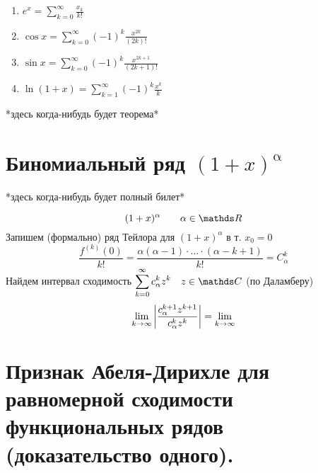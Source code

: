 \documentclass[matan]{subfiles}
\begin{document}
  \begin{examples}
  	\begin{enumerate}
  		\item $\displaystyle e^x = \sum_{k = 0}^\infty \frac{x_k}{k!}$
  		\item $\displaystyle \cos x = \sum_{k = 0}^\infty (-1)^k \frac{x^{2k} }{(2k)!}$
  		\item $\displaystyle \sin x = \sum_{k = 0}^\infty (-1)^k \frac{x^{2k + 1} }{(2k + 1)!}$
  		\item $\displaystyle \ln (1 + x) = \sum_{k = 1}^\infty (-1)^k \frac{x^k}{k}$
  	\end{enumerate}
  \end{examples}

  \begin{TTheorem}
    *здесь когда-нибудь будет теорема*
  \end{TTheorem}


  \newpage
  \section{Биномиальный ряд $(1 + x)^\upalpha$}

  *здесь когда-нибудь будет полный билет*

  \begin{Definition}
  	\[(1 + x)^\alpha \q\q \alpha \in \R\]
  	Запишем (формально) ряд Тейлора для $(1 + x)^\alpha$ в т. $x_0 = 0$
  	\[\frac{f^{(k)} (0)}{k!} = \frac{\alpha(\alpha - 1) \cdot ... \cdot (\alpha - k + 1)}{k!} =
  	C_{\alpha}^k \]
  	Найдем интервал сходимость $\displaystyle \sum_{k = 0}^\infty c_{\alpha}^k z^k \q z \in \CC$ (по Даламберу)
  	\[\lim_{k \to \infty} \left|\frac{c_{\alpha}^{k + 1} z^{k + 1}}{c_{\alpha}^k z^k }\right| =
  	\lim_{k \to \infty}  \]
  \end{Definition}

  \newpage
  \section{Признак Абеля-Дирихле для равномерной сходимости функциональных рядов (доказательство одного).}
\end{document}
